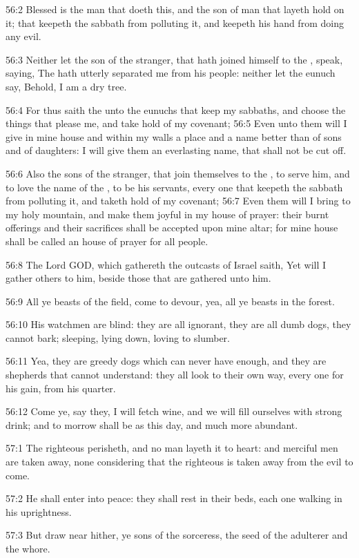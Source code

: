 56:2 Blessed is the man that doeth this, and the son of man that layeth hold on it; that keepeth the sabbath from polluting it, and keepeth his hand from doing any evil.

56:3 Neither let the son of the stranger, that hath joined himself to the \LORD, speak, saying, The \LORD hath utterly separated me from his people: neither let the eunuch say, Behold, I am a dry tree.

56:4 For thus saith the \LORD unto the eunuchs that keep my sabbaths, and choose the things that please me, and take hold of my covenant; 56:5 Even unto them will I give in mine house and within my walls a place and a name better than of sons and of daughters: I will give them an everlasting name, that shall not be cut off.

56:6 Also the sons of the stranger, that join themselves to the \LORD, to serve him, and to love the name of the \LORD, to be his servants, every one that keepeth the sabbath from polluting it, and taketh hold of my covenant; 56:7 Even them will I bring to my holy mountain, and make them joyful in my house of prayer: their burnt offerings and their sacrifices shall be accepted upon mine altar; for mine house shall be called an house of prayer for all people.

56:8 The Lord GOD, which gathereth the outcasts of Israel saith, Yet will I gather others to him, beside those that are gathered unto him.

56:9 All ye beasts of the field, come to devour, yea, all ye beasts in the forest.

56:10 His watchmen are blind: they are all ignorant, they are all dumb dogs, they cannot bark; sleeping, lying down, loving to slumber.

56:11 Yea, they are greedy dogs which can never have enough, and they are shepherds that cannot understand: they all look to their own way, every one for his gain, from his quarter.

56:12 Come ye, say they, I will fetch wine, and we will fill ourselves with strong drink; and to morrow shall be as this day, and much more abundant.

57:1 The righteous perisheth, and no man layeth it to heart: and merciful men are taken away, none considering that the righteous is taken away from the evil to come.

57:2 He shall enter into peace: they shall rest in their beds, each one walking in his uprightness.

57:3 But draw near hither, ye sons of the sorceress, the seed of the adulterer and the whore.

